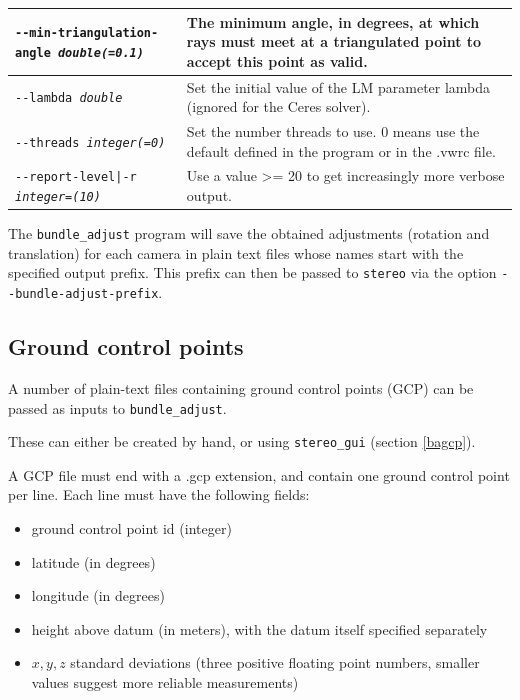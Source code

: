 \begin{longtable}{|l|p{8.0cm}|}
\texttt{-\/-min-triangulation-angle \textit{double(=0.1)}} &
The minimum angle, in degrees, at which rays must meet at a triangulated point to accept this point as valid.
\\ \hline

\texttt{-\/-lambda \textit{double}} & Set the initial value of the LM parameter
lambda (ignored for the Ceres solver).\\ \hline

\texttt{-\/-threads \textit{integer(=0)}} & Set the number threads to use. 0 means use the default defined in the program or in the .vwrc file.\\ \hline

\texttt{-\/-report-level|-r \textit{integer=(10)}} & Use a value >= 20 to
get increasingly more verbose output. \\ \hline
\end{longtable}

The \texttt{bundle\_adjust} program will save the obtained adjustments
(rotation and translation) for each camera in plain text files whose
names start with the specified output prefix. This prefix can then be
passed to \texttt{stereo} via the option
\texttt{-\/-bundle-adjust-prefix}.

\subsection{Ground control points}

A number of plain-text files containing ground control points (GCP) can be
passed as inputs to \texttt{bundle\_adjust}.

These can either be created by hand, or using \texttt{stereo\_gui}
(section \ref{bagcp}).

A GCP file must end with a .gcp extension, and contain one ground
control point per line. Each line must have the following fields:
\begin{itemize}
\item ground control point id (integer)
\item latitude (in degrees)
\item longitude (in degrees)
\item height above datum (in meters), with the datum itself specified separately
\item $x, y, z$ standard deviations (three positive floating point
  numbers, smaller values suggest more reliable measurements)
\end{itemize}

